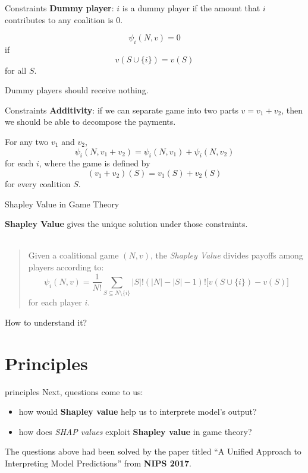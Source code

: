 \documentclass[10pt]{beamer}
\newcommand{\shap}{\emph{SHAP values}\xspace}
\begin{document}
\begin{frame}{Constraints}
  \textbf{Dummy player}: $i$ is a dummy player if the amount that $i$ contributes to any coalition is 0.

  $$\psi_{i}(N, v) = 0$$ if $$v(S\cup \{i\})=v(S)$$ for all $S$.

  Dummy players should receive nothing.
\end{frame}

\begin{frame}{Constraints}
  \textbf{Additivity}: if we can separate game into two parts $v=v_1 + v_2$, then we should be able to decompose the payments.

  For any two $v_1$ and $v_2$, $$\psi_{i}(N, v_1+v_2)=\psi_{i}(N, v_1)+\psi_{i}(N, v_2)$$ for each $i$, where the game is defined by $$(v_1+v_2)(S)=v_1(S)+v_2(S)$$ for every coalition $S$.
  
\end{frame}

\begin{frame}{Shapley Value in Game Theory}

  \textbf{Shapley Value} gives the \alert{unique solution} under those constraints.\\ \hspace*{\fill} \\

  \begin{quote}
    Given a coalitional game $(N, v)$, the \textit{Shapley Value} divides payoffs among players according to:
    \begin{equation*}
       \psi_{i}(N, v) = \frac{1}{N !}\sum_{S\subseteq N\setminus \{i\}} |S|!(|N|-|S|-1) !\bigl[v(S\cup \{i\})-v(S)\bigr]
    \end{equation*}
    for each player $i$.
  \end{quote}

  How to understand it?
\end{frame}

\section{Principles}

\begin{frame}{principles}
  Next, questions come to us:
  \begin{itemize}
    \item how would \textbf{Shapley value} help us to interprete model's output?
    \item how does \shap exploit \textbf{Shapley value} in game theory?
  \end{itemize}

  The questions above had been solved by the paper titled ``A Unified Approach to Interpreting Model Predictions'' from \textbf{NIPS 2017}.
\end{frame}
\end{document}
